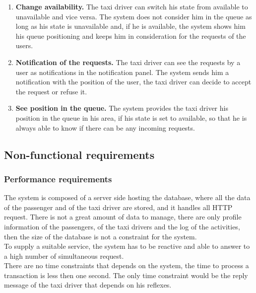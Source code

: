 \documentclass[18pt,oneside,a4paper, titlepage]{article}
\begin{document}
\begin{enumerate}
			\item \textbf{Change availability.}
				The taxi driver can switch his state from available to unavailable and vice versa. The system does not consider him in the queue as long as his state is unavailable and, if he is available, the system shows him his queue positioning and keeps him in consideration for the requests of the users.
				
			\item \textbf{Notification of the requests.}
				The taxi driver can see the requests by a user as notifications in the notification panel. The system sends him a notification with the position of the user, the taxi driver can decide to accept the request or refuse it.
				
			\item \textbf{See position in the queue.}
				The system provides the taxi driver his position in the queue in his area, if his state is set to available, so that he is always able to know if there can be any incoming requests.
				
		\end{enumerate}
	\subsection{Non-functional requirements}
		\subsubsection{Performance requirements}
			The system is composed of a server side hosting the database, where all the data of the passenger and of the taxi driver are stored, and it handles all HTTP request. There is not a great amount of data to manage, there are only profile information of the passengers, of the taxi drivers and the log of the activities, then the size of the database is not a constraint for the system.\\ To supply a suitable service, the system has to be reactive and able to answer to a high number of simultaneous request.\\ There are no time constraints that depends on the system, the time to process a transaction is less then one second. The only time constraint would be the reply message of the taxi driver that depends on his reflexes.
\end{document}
